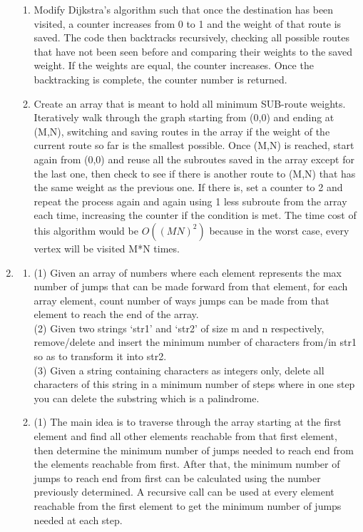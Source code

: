 \documentclass{article}
\begin{document}
\begin{enumerate}
\begin{enumerate}
	\item Modify Dijkstra's algorithm such that once the destination has been visited, a counter increases from 0 to 1 and the weight of that route is saved. The code then backtracks 				recursively, checking all possible routes that have not been seen before and comparing their weights to the saved weight. If the weights are equal, the counter increases. Once the 			backtracking is complete, the counter number is returned.
	\item Create an array that is meant to hold all minimum SUB-route weights. Iteratively walk through the graph starting from (0,0) and ending at (M,N), switching and saving routes in the 			array if the weight of the current route so far is the smallest possible. Once (M,N) is reached, start again from (0,0) and reuse all the subroutes saved in the array except for the last one, 		then check to see if there is another route to (M,N) that has the same weight as the previous one. If there is, set a counter to 2 and repeat the process again and again using 1 less 			subroute from the array each time, increasing the counter if the condition is met. The time cost of this algorithm would be \begin{math}O((MN)^2)\end{math} because in the worst case, 			every vertex will be visited M*N times.
	\end{enumerate}
\item \begin{enumerate}
	\item (1) Given an array of numbers where each element represents the max number of jumps that can be made forward from that element, for each array element, count number of ways 		jumps can be made from that element to reach the end of the array. \\(2) Given two strings ‘str1’ and ‘str2’ of size m and n respectively, remove/delete and insert the minimum number of 			characters from/in str1 so as to transform it into str2.\\ (3) Given a string containing characters as integers only, delete all characters of this string in a minimum number of steps where in 			one step you can delete the substring which is a palindrome.
	\item (1) The main idea is to traverse through the array starting at the first element and find all other elements reachable from that first element, then determine the minimum number of 			jumps needed to reach end from the elements reachable from first. After that, the minimum number of jumps to reach end from first can be calculated using the number previously 				determined. A recursive call can be used at every element reachable from the first element to get the minimum number of jumps needed at each step.\\

\end{enumerate}
\end{enumerate}
\end{document}
